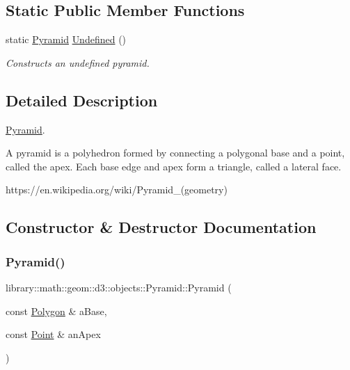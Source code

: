 \subsection*{Static Public Member Functions}
\begin{DoxyCompactItemize}
\item 
static \hyperlink{classlibrary_1_1math_1_1geom_1_1d3_1_1objects_1_1_pyramid}{Pyramid} \hyperlink{classlibrary_1_1math_1_1geom_1_1d3_1_1objects_1_1_pyramid_a5de06284f14f60360867df40af4b7aac}{Undefined} ()
\begin{DoxyCompactList}\small\item\em Constructs an undefined pyramid. \end{DoxyCompactList}\end{DoxyCompactItemize}


\subsection{Detailed Description}
\hyperlink{classlibrary_1_1math_1_1geom_1_1d3_1_1objects_1_1_pyramid}{Pyramid}. 

A pyramid is a polyhedron formed by connecting a polygonal base and a point, called the apex. Each base edge and apex form a triangle, called a lateral face.

https\+://en.wikipedia.\+org/wiki/\+Pyramid\+\_\+(geometry) 

\subsection{Constructor \& Destructor Documentation}
\mbox{\label{classlibrary_1_1math_1_1geom_1_1d3_1_1objects_1_1_pyramid_aafaaeed187584040b306b7de7ee57fd4}} 
\subsubsection{\texorpdfstring{Pyramid()}{Pyramid()}}
{\footnotesize\ttfamily library\+::math\+::geom\+::d3\+::objects\+::\+Pyramid\+::\+Pyramid (\begin{DoxyParamCaption}\item[{const \hyperlink{classlibrary_1_1math_1_1geom_1_1d3_1_1objects_1_1_polygon}{Polygon} \&}]{a\+Base,  }\item[{const \hyperlink{classlibrary_1_1math_1_1geom_1_1d3_1_1objects_1_1_point}{Point} \&}]{an\+Apex }\end{DoxyParamCaption})}




